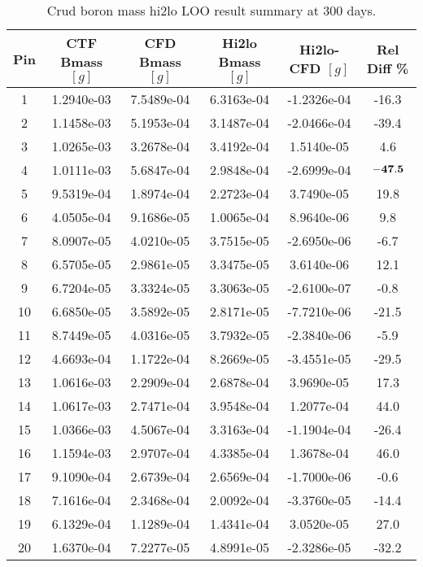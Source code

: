 \begin{table}[h]
    \begin{center}
    \caption[Hi2lo crud boron mass results]{Crud boron mass hi2lo LOO result summary at 300 days.}
    \begin{tabular}[h]{|c|c|c|c|c|c|}
        \hline
        Pin & CTF Bmass $[g]$ & CFD Bmass $[g]$ & Hi2lo Bmass $[g]$ & Hi2lo-CFD $[g]$ & Rel Diff \% \\
\hline
1  & 1.2940e-03 & 7.5489e-04 & 6.3163e-04 & -1.2326e-04 &  -16.3 \\
2  & 1.1458e-03 & 5.1953e-04 & 3.1487e-04 & -2.0466e-04 &  -39.4 \\
3  & 1.0265e-03 & 3.2678e-04 & 3.4192e-04 & 1.5140e-05 &  4.6 \\ 
4  & 1.0111e-03 & 5.6847e-04 & 2.9848e-04 & -2.6999e-04 &  $\bf{-47.5}$ \\
5  & 9.5319e-04 & 1.8974e-04 & 2.2723e-04 & 3.7490e-05 &  19.8 \\ 
6  & 4.0505e-04 & 9.1686e-05 & 1.0065e-04 & 8.9640e-06 &  9.8 \\ 
7  & 8.0907e-05 & 4.0210e-05 & 3.7515e-05 & -2.6950e-06 &  -6.7 \\
8  & 6.5705e-05 & 2.9861e-05 & 3.3475e-05 & 3.6140e-06 &  12.1 \\ 
9  & 6.7204e-05 & 3.3324e-05 & 3.3063e-05 & -2.6100e-07 &  -0.8 \\
10  &6.6850e-05 & 3.5892e-05 & 2.8171e-05 & -7.7210e-06 &  -21.5 \\
11  &8.7449e-05 & 4.0316e-05 & 3.7932e-05 & -2.3840e-06 &  -5.9 \\
12  &4.6693e-04 & 1.1722e-04 & 8.2669e-05 & -3.4551e-05 &  -29.5 \\
13  &1.0616e-03 & 2.2909e-04 & 2.6878e-04 & 3.9690e-05 &  17.3 \\ 
14  &1.0617e-03 & 2.7471e-04 & 3.9548e-04 & 1.2077e-04 &  44.0 \\ 
15  &1.0366e-03 & 4.5067e-04 & 3.3163e-04 & -1.1904e-04 &  -26.4 \\
16  &1.1594e-03 & 2.9707e-04 & 4.3385e-04 & 1.3678e-04 &  46.0 \\ 
17  &9.1090e-04 & 2.6739e-04 & 2.6569e-04 & -1.7000e-06 &  -0.6 \\
18  &7.1616e-04 & 2.3468e-04 & 2.0092e-04 & -3.3760e-05 &  -14.4 \\
19  &6.1329e-04 & 1.1289e-04 & 1.4341e-04 & 3.0520e-05 &  27.0 \\ 
20  &1.6370e-04 & 7.2277e-05 & 4.8991e-05 & -2.3286e-05 &  -32.2 \\

\end{tabular}
\end{center}
\end{table}
